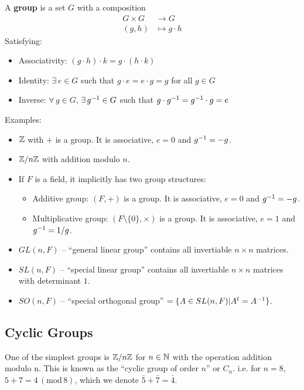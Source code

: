 \documentclass[a4paper]{article}
\begin{document}
\begin{definition}
    A \textbf{group} is a set $G$ with a composition
    \begin{align}
        G\times G &\to G \\
        (g, h) &\mapsto g\cdot h
    \end{align}
    Satisfying:
    \begin{itemize}
        \item Associativity: $(g\cdot h)\cdot k = g\cdot (h\cdot k)$
        \item Identity: $\exists\, e\in G$ such that $g\cdot e = e\cdot g = g$ for all $g\in G$
        \item Inverse: $\forall\, g\in G$, $\exists\, g^{-1}\in G$ such that $g\cdot g^{-1} = g^{-1}\cdot g = e$
    \end{itemize}
\end{definition}

Examples:
\begin{itemize}
    \item $\mathbb{Z}$ with $+$ is a group. It is associative, $e = 0$ and $g^{-1} = -g$.
    \item $\mathbb{Z}/n\mathbb{Z}$ with addition modulo $n$.
    \item If $F$ is a field, it implicitly has two group structures:
    \begin{itemize}
        \item Additive group: $(F,+)$ is a group. It is associative, $e = 0$ and $g^{-1} = -g$.
        \item Multiplicative group: $(F\setminus\{0\},\times)$ is a group. It is associative, $e = 1$ and $g^{-1} = 1/g$.
    \end{itemize}
    \item $GL(n,F)$ -- ``general linear group'' contains all invertiable $n\times n$ matrices.
    \item $SL(n,F)$ -- ``special linear group'' contains all invertiable $n\times n$ matrices with determinant $1$.
    \item $SO(n,F)$ -- ``special orthogonal group'' $=\{A\in SL(n,F)|A^t=A^{-1}\}$.
\end{itemize}
\subsection{Cyclic Groups}
One of the simplest groups is $\mathbb{Z}/n\mathbb{Z}$ for $n\in\mathbb{N}$ with the operation addition modulo n. This is known as the ``cyclic group of order $n$'' or $C_n$. i.e. for $n=8$, $5+7=4\,(\mathrm{mod}\,8)$, which we denote $\bar{5}+\bar{7}=\bar{4}$.
\end{document}
